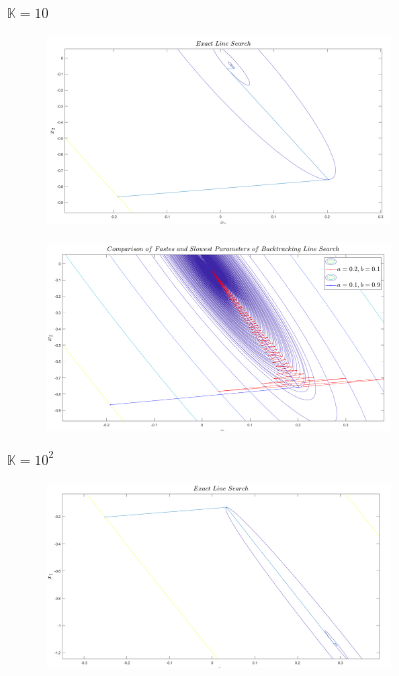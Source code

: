 \documentclass[12pt]{article}
\begin{document}
\begin{enumerate}
\begin{enumerate}
\begin{figure}
\begin{subfigure}[b]{0.45\textwidth}
				\end{subfigure}
				\caption{$\mathbb{K}=10$}
			\end{figure}
			\begin{figure}
				\centering
				\begin{subfigure}[b]{0.45\textwidth}
					\centering
					\includegraphics[width=\textwidth]{4_3.png}
				\end{subfigure}
				\hfill
				\begin{subfigure}[b]{0.45\textwidth}
					\centering
					\includegraphics[width=\textwidth]{4_2.png}
				\end{subfigure}
				\caption{$\mathbb{K}=10^2$}
			\end{figure}
			\begin{figure}
				\centering
				\begin{subfigure}[b]{0.45\textwidth}
					\centering
					\includegraphics[width=\textwidth]{5_3.png}

\end{subfigure}
\end{figure}
\end{enumerate}
\end{enumerate}
\end{document}
